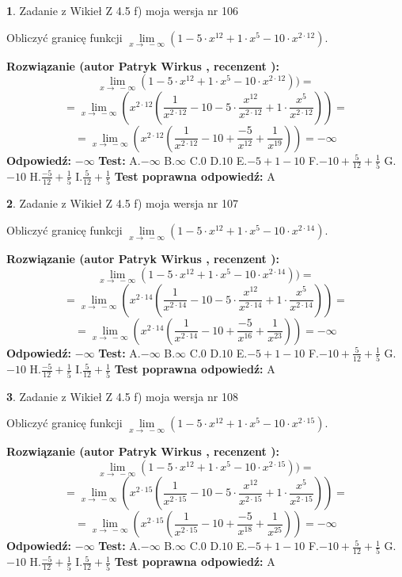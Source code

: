 \documentclass[12pt, a4paper]{article}
\theoremstyle{definition} %
\newtheorem{zad}{}
\newcommand{\zadStart}[1]{\begin{zad}#1\newline}
\newcommand{\zadStop}{\end{zad}}
\newcommand{\rozwStart}[2]{\noindent \textbf{Rozwiązanie (autor #1 , recenzent #2): }\newline}
\newcommand{\rozwStop}{\newline}
\newcommand{\odpStart}{\noindent \textbf{Odpowiedź:}\newline}
\newcommand{\odpStop}{\newline}
\newcommand{\testStart}{\noindent \textbf{Test:}\newline}
\newcommand{\testStop}{\newline}
\newcommand{\kluczStart}{\noindent \textbf{Test poprawna odpowiedź:}\newline}
\newcommand{\kluczStop}{\newline}
\begin{document}
\zadStart{Zadanie z Wikieł Z 4.5 f) moja wersja nr 106}



Obliczyć granicę funkcji  $\lim\limits_{x\to\ -\infty}(1 - 5 \cdot x^{12}+1 \cdot x^{5}- 10 \cdot x^{2\cdot12})$.
\zadStop
\rozwStart{Patryk Wirkus}{}
$$\lim\limits_{x\to\ -\infty}(1 - 5 \cdot x^{12}+1 \cdot x^{5}- 10 \cdot x^{2\cdot12}))=$$
$$=\lim\limits_{x\to\ -\infty}(x^{2\cdot12}(\frac{1}{x^{2\cdot12}}-10 -5 \cdot \frac{x^{12}}{x^{2\cdot12}}+1 \cdot \frac{x^{5}}{x^{2\cdot12}}))=$$
$$=\lim\limits_{x\to\ -\infty}(x^{2\cdot12}(\frac{1}{x^{2\cdot12}}-10 + \frac{-5}{x^{12}}+ \frac{1}{x^{19}}))=-\infty$$
\rozwStop
\odpStart
$-\infty$
\odpStop
\testStart
A.$-\infty$ B.$\infty$ C.$0$ D.$10$ E.$-5 + 1 - 10$
F.$-10+\frac{5}{12}+\frac{1}{5}$ G.$-10$
H.$\frac{-5}{12}+\frac{1}{5}$
I.$\frac{5}{12}+\frac{1}{5}$
\testStop
\kluczStart
A
\kluczStop



\zadStart{Zadanie z Wikieł Z 4.5 f) moja wersja nr 107}



Obliczyć granicę funkcji  $\lim\limits_{x\to\ -\infty}(1 - 5 \cdot x^{12}+1 \cdot x^{5}- 10 \cdot x^{2\cdot14})$.
\zadStop
\rozwStart{Patryk Wirkus}{}
$$\lim\limits_{x\to\ -\infty}(1 - 5 \cdot x^{12}+1 \cdot x^{5}- 10 \cdot x^{2\cdot14}))=$$
$$=\lim\limits_{x\to\ -\infty}(x^{2\cdot14}(\frac{1}{x^{2\cdot14}}-10 -5 \cdot \frac{x^{12}}{x^{2\cdot14}}+1 \cdot \frac{x^{5}}{x^{2\cdot14}}))=$$
$$=\lim\limits_{x\to\ -\infty}(x^{2\cdot14}(\frac{1}{x^{2\cdot14}}-10 + \frac{-5}{x^{16}}+ \frac{1}{x^{23}}))=-\infty$$
\rozwStop
\odpStart
$-\infty$
\odpStop
\testStart
A.$-\infty$ B.$\infty$ C.$0$ D.$10$ E.$-5 + 1 - 10$
F.$-10+\frac{5}{12}+\frac{1}{5}$ G.$-10$
H.$\frac{-5}{12}+\frac{1}{5}$
I.$\frac{5}{12}+\frac{1}{5}$
\testStop
\kluczStart
A
\kluczStop



\zadStart{Zadanie z Wikieł Z 4.5 f) moja wersja nr 108}



Obliczyć granicę funkcji  $\lim\limits_{x\to\ -\infty}(1 - 5 \cdot x^{12}+1 \cdot x^{5}- 10 \cdot x^{2\cdot15})$.
\zadStop
\rozwStart{Patryk Wirkus}{}
$$\lim\limits_{x\to\ -\infty}(1 - 5 \cdot x^{12}+1 \cdot x^{5}- 10 \cdot x^{2\cdot15}))=$$
$$=\lim\limits_{x\to\ -\infty}(x^{2\cdot15}(\frac{1}{x^{2\cdot15}}-10 -5 \cdot \frac{x^{12}}{x^{2\cdot15}}+1 \cdot \frac{x^{5}}{x^{2\cdot15}}))=$$
$$=\lim\limits_{x\to\ -\infty}(x^{2\cdot15}(\frac{1}{x^{2\cdot15}}-10 + \frac{-5}{x^{18}}+ \frac{1}{x^{25}}))=-\infty$$
\rozwStop
\odpStart
$-\infty$
\odpStop
\testStart
A.$-\infty$ B.$\infty$ C.$0$ D.$10$ E.$-5 + 1 - 10$
F.$-10+\frac{5}{12}+\frac{1}{5}$ G.$-10$
H.$\frac{-5}{12}+\frac{1}{5}$
I.$\frac{5}{12}+\frac{1}{5}$
\testStop
\kluczStart
A
\kluczStop
\end{document}
